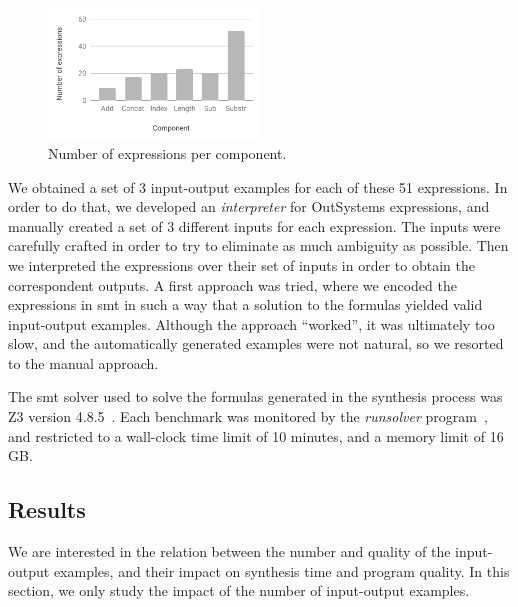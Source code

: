 \begin{figure}
  \centering
  \includegraphics[width=0.5\textwidth]{assets/bar-chart-components-freq-51.pdf}
  \caption{Number of expressions per component.}
  \label{fig:bar-chart-components-freq-51}
\end{figure}

We obtained a set of 3 input-output examples for each of these 51 expressions.
In order to do that, we developed an \textit{interpreter} for OutSystems
expressions, and manually created a set of 3 different inputs for each
expression.
The inputs were carefully crafted in order to try to eliminate as much ambiguity
as possible.
Then we interpreted the expressions over their set of inputs in order to
obtain the correspondent outputs.
A first approach was tried, where we encoded the expressions in \gls{smt} in
such a way that a solution to the formulas yielded valid input-output examples.
Although the approach ``worked'', it was ultimately too slow, and the
automatically generated examples were not natural, so we resorted to the manual
approach.

The \gls{smt} solver used to solve the formulas generated in the synthesis
process was Z3 version 4.8.5~\cite{DeMoura:2008:ZES}.
Each benchmark was monitored by the \textit{runsolver}
program~\cite{Roussel:2011:JSAT}, and restricted to a wall-clock time limit of
10 minutes, and a memory limit of 16 GB.

\subsection{Results}
\label{sec:results}

We are interested in the relation between the number and quality of the
input-output examples, and their impact on synthesis time and program quality.
In this section, we only study the impact of the number of input-output
examples.

